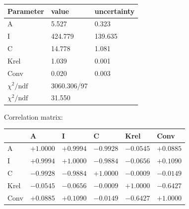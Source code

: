 \begin{tabular}{l|ll}
Parameter & value & uncertainty \\ \hline
 A & 5.527 & 0.323 \\ 
 I & 424.779 & 139.635 \\ 
 C & 14.778 & 1.081 \\ 
 Krel & 1.039 & 0.001 \\ 
 Conv & 0.020 & 0.003 \\ 
 \hline
 $\chi^2/\mathrm{ndf}$ & 3060.306/97 & \\
 $\chi^2/\mathrm{ndf}$ & 31.550 & \\
\end{tabular}

Correlation matrix:

\begin{tabular}{l|lllll} 
 & A & I & C & Krel & Conv \\ \hline
 A & $+1.0000$ & $+0.9994$ & $-0.9928$ & $-0.0545$ & $+0.0885$ \\ 
 I & $+0.9994$ & $+1.0000$ & $-0.9884$ & $-0.0656$ & $+0.1090$ \\ 
 C & $-0.9928$ & $-0.9884$ & $+1.0000$ & $-0.0009$ & $-0.0149$ \\ 
 Krel & $-0.0545$ & $-0.0656$ & $-0.0009$ & $+1.0000$ & $-0.6427$ \\ 
 Conv & $+0.0885$ & $+0.1090$ & $-0.0149$ & $-0.6427$ & $+1.0000$ \\ 
\end{tabular}
